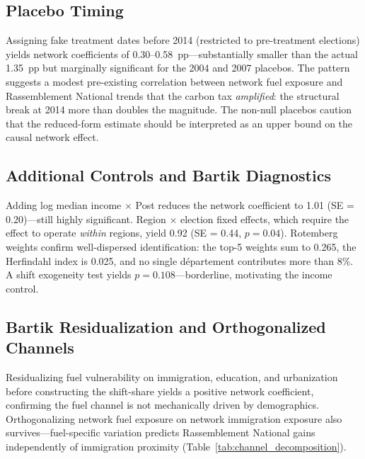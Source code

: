 \documentclass[12pt]{article}
\newcommand{\rn}{Rassemblement National}
\newcommand{\dept}{d\'{e}partement}
\begin{document}
\subsection{Placebo Timing}

Assigning fake treatment dates before 2014 (restricted to pre-treatment elections) yields network coefficients of 0.30--0.58~pp---substantially smaller than the actual 1.35~pp but marginally significant for the 2004 and 2007 placebos. The pattern suggests a modest pre-existing correlation between network fuel exposure and \rn{} trends that the carbon tax \emph{amplified}: the structural break at 2014 more than doubles the magnitude. The non-null placebos caution that the reduced-form estimate should be interpreted as an upper bound on the causal network effect.

\subsection{Additional Controls and Bartik Diagnostics}

Adding log median income $\times$ Post reduces the network coefficient to 1.01 (SE = 0.20)---still highly significant. Region $\times$ election fixed effects, which require the effect to operate \emph{within} regions, yield 0.92 (SE = 0.44, $p = 0.04$). Rotemberg weights \citep{goldsmith2020bartik} confirm well-dispersed identification: the top-5 weights sum to 0.265, the Herfindahl index is 0.025, and no single \dept{} contributes more than 8\%. A shift exogeneity test yields $p = 0.108$---borderline, motivating the income control.



\subsection{Bartik Residualization and Orthogonalized Channels}

Residualizing fuel vulnerability on immigration, education, and urbanization before constructing the shift-share \citep{borusyak2022quasi} yields a positive network coefficient, confirming the fuel channel is not mechanically driven by demographics. Orthogonalizing network fuel exposure on network immigration exposure also survives---fuel-specific variation predicts \rn{} gains independently of immigration proximity (Table~\ref{tab:channel_decomposition}).


\end{document}
